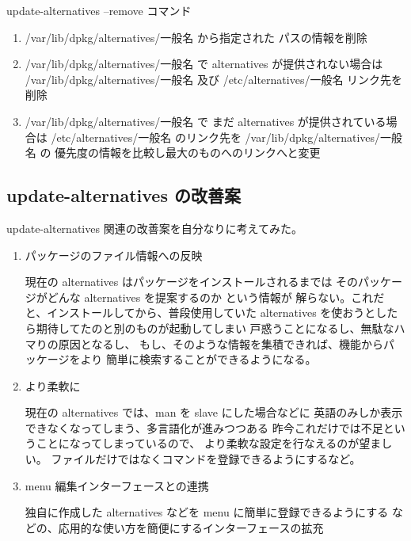 \documentclass[mingoth,a4paper]{jsarticle}
\begin{document}
   update-alternatives --remove コマンド

\begin{enumerate}
 \item      /var/lib/dpkg/alternatives/一般名 から指定された パスの情報を削除

 \item      /var/lib/dpkg/alternatives/一般名 で alternatives が提供されない場合は
        /var/lib/dpkg/alternatives/一般名 及び /etc/alternatives/一般名
        リンク先を削除

 \item      /var/lib/dpkg/alternatives/一般名 で まだ alternatives が提供されている場合は
        /etc/alternatives/一般名 のリンク先を /var/lib/dpkg/alternatives/一般名 の
        優先度の情報を比較し最大のものへのリンクへと変更
\end{enumerate}


\subsection{update-alternatives の改善案}

   update-alternatives 関連の改善案を自分なりに考えてみた。


\begin{enumerate}
 \item パッケージのファイル情報への反映
     
      現在の alternatives はパッケージをインストールされるまでは
      そのパッケージがどんな alternatives を提案するのか という情報が
      解らない。これだと、インストールしてから、普段使用していた 
      alternatives を使おうとしたら期待してたのと別のものが起動してしまい
      戸惑うことになるし、無駄なハマりの原因となるし、
      もし、そのような情報を集積できれば、機能からパッケージをより
      簡単に検索することができるようになる。

 \item より柔軟に
      
       現在の alternatives では、man を slave にした場合などに
       英語のみしか表示できなくなってしまう、多言語化が進みつつある
       昨今これだけでは不足ということになってしまっているので、
       より柔軟な設定を行なえるのが望ましい。
       ファイルだけではなくコマンドを登録できるようにするなど。

 \item menu 編集インターフェースとの連携

       独自に作成した alternatives などを menu に簡単に登録できるようにする
       などの、応用的な使い方を簡便にするインターフェースの拡充

\end{enumerate}
\end{document}
